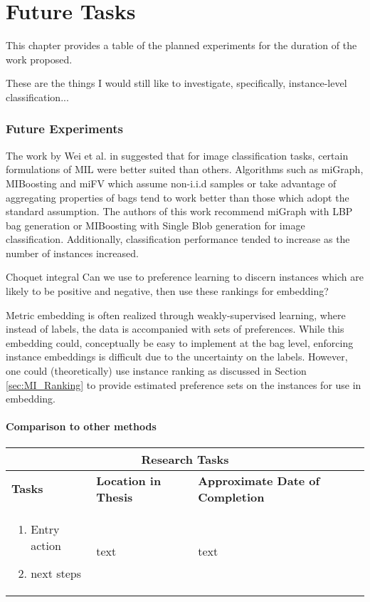 \chapter{Future Tasks}
This chapter provides a table of the planned experiments for the duration of the work proposed.

These are the things I would still like to investigate, specifically, instance-level classification...

\subsection{Future Experiments}

The work by Wei et al. in \cite{Wei2016ImageBagGenerators} suggested that  for image classification tasks, certain formulations of MIL were better suited than others.  Algorithms such as miGraph, MIBoosting and miFV which assume non-i.i.d samples or take advantage of aggregating properties of bags tend to work better than those which adopt the standard assumption.  The authors of this work recommend miGraph with LBP bag generation or MIBoosting with Single Blob generation for image classification.  Additionally, classification performance tended to increase as the number of instances increased.

Choquet integral
Can we use to preference learning to discern instances which are likely to be positive and negative, then use these rankings for embedding?

Metric embedding is often realized through weakly-supervised learning, where instead of labels, the data is accompanied with sets of preferences. While this embedding could, conceptually be easy to implement at the bag level, enforcing instance embeddings is difficult due to the uncertainty on the labels.  However, one could (theoretically) use instance ranking as discussed in Section \ref{sec:MI_Ranking} to provide estimated preference sets on the instances for use in embedding.

\subsubsection{Comparison to other methods}

\begin{table}[H]
	\caption[List of Research Tasks]{List of research tasks and their corresponding locations in the dissertation document.}
	\label{tab:future_tasks}
	\begin{longtable}{ |p{6cm}|p{4cm}|p{4cm}|  } 
		\hline
		\multicolumn{3}{|c|}{\textbf{Research Tasks}} \\
		\hline
		\hline
		\textbf{Tasks} & \textbf{Location in Thesis} & \textbf{Approximate Date of Completion}\\
		\hline
		\begin{enumerate}
			\item Entry action
			\item next steps
		\end{enumerate} & text & text\\
		\hline
	\end{longtable}
\end{table}